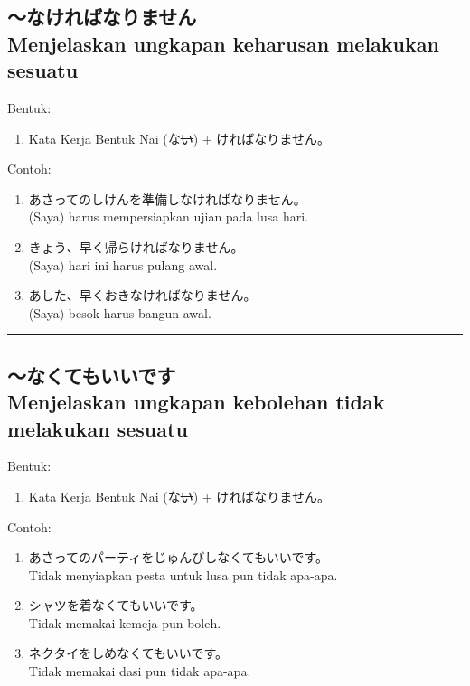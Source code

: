 \subsection*{
    ～なければなりません \\
    Menjelaskan ungkapan keharusan melakukan sesuatu
}
Bentuk:
\begin{enumerate}
    \item Kata Kerja Bentuk Nai (な\sout{い}) + ければなりません。
\end{enumerate}
Contoh: 
\begin{enumerate}
    \item あさってのしけんを準備しなければなりません。
    \\ (Saya) harus mempersiapkan ujian pada lusa hari.
    \item きょう、早く帰らければなりません。
    \\ (Saya) hari ini harus pulang awal.
    \item あした、早くおきなければなりません。
    \\ (Saya) besok harus bangun awal.
\end{enumerate}

\vspace{0.2cm}\hrule height 1pt\vspace{0.2cm}

\newpage
\subsection*{
    ～なくてもいいです \\
    Menjelaskan ungkapan kebolehan tidak melakukan sesuatu
}
Bentuk:
\begin{enumerate}
    \item Kata Kerja Bentuk Nai (な\sout{い}) + ければなりません。
\end{enumerate}
Contoh: 
\begin{enumerate}
    \item あさってのパーティをじゅんびしなくてもいいです。
    \\ Tidak menyiapkan pesta untuk lusa pun tidak apa-apa.
    \item シャツを着なくてもいいです。
    \\ Tidak memakai kemeja pun boleh.
    \item ネクタイをしめなくてもいいです。
    \\ Tidak memakai dasi pun tidak apa-apa.
\end{enumerate}

